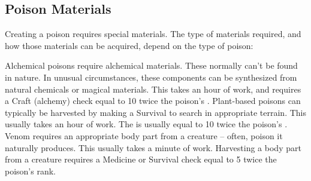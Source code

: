   \subsection{Poison Materials}\label{Poison Materials}
    Creating a poison requires special materials.
    The type of materials required, and how those materials can be acquired, depend on the type of poison:

    \begin{raggeditemize}
       Alchemical poisons require alchemical materials.
        These normally can't be found in nature.
        In unusual circumstances, these components can be synthesized from natural chemicals or magical materials.
        This takes an hour of work, and requires a Craft (alchemy) check equal to 10 \add twice the poison's .
       Plant-based poisons can typically be harvested by making a Survival  to search in appropriate terrain.
        This usually takes an hour of work.
        The  is usually equal to 10 \add twice the poison's .
       Venom requires an appropriate body part from a creature -- often, poison it naturally produces.
        This usually takes a minute of work.
        Harvesting a body part from a creature requires a Medicine or Survival check equal to 5 \add twice the poison's rank.
    \end{raggeditemize}
